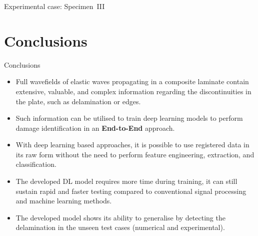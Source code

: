 \documentclass[10pt,aspectratio=169]{beamer} %
\begin{document}
\setcounter{subfigure}{0}
\begin{frame}{Experimental case: Specimen~III}
		\begin{figure}
		\centering
		\quad
		\quad
	\end{figure}
\end{frame}


\section{Conclusions}
\begin{frame}{Conclusions}
	\begin{itemize}[<alert@+>]
		\item Full wavefields of elastic waves propagating in a composite laminate contain extensive, valuable, and complex information regarding the discontinuities in the plate, such as delamination or edges.
		\item Such information can be utilised to train deep learning models
		to perform damage identification in an {\textbf{End-to-End}} approach.
		\item With deep learning based approaches, it is possible to use registered data in its raw form without the need to perform feature engineering, extraction, and classification.
		\item The developed DL model requires more time during training, it can still sustain rapid and faster testing compared to conventional signal processing and machine learning methods.
		\item The developed model shows its ability to generalise by detecting the delamination in the unseen test cases (numerical and experimental).
	\end{itemize}
\end{frame}
\end{document}
